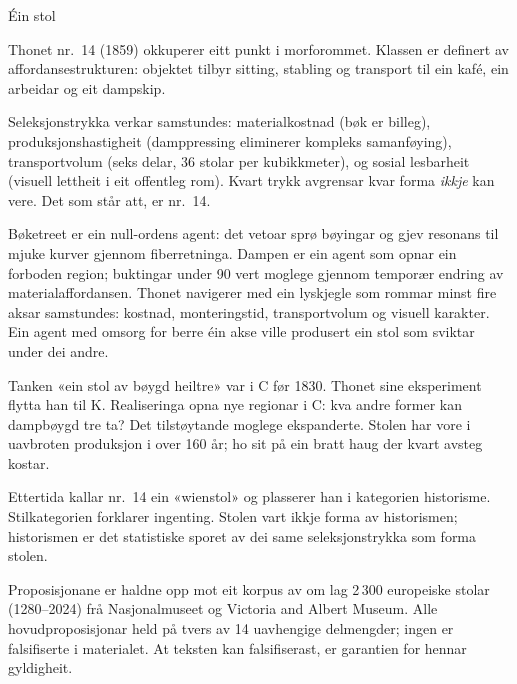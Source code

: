 \backmatter
{}
\begin{widebody}

\begin{overgang}Éin stol\end{overgang}

Thonet nr.~14 (1859) okkuperer eitt punkt i morforommet. Klassen er definert av affordansestrukturen: objektet tilbyr sitting, stabling og transport til ein kafé, ein arbeidar og eit dampskip.

Seleksjonstrykka verkar samstundes: materialkostnad (bøk er billeg), produksjonshastigheit (damppressing eliminerer kompleks samanføying), transportvolum (seks delar, 36 stolar per kubikkmeter), og sosial lesbarheit (visuell lettheit i eit offentleg rom). Kvart trykk avgrensar kvar forma \textit{ikkje} kan vere. Det som står att, er nr.~14.

Bøketreet er ein null-ordens agent: det vetoar sprø bøyingar og gjev resonans til mjuke kurver gjennom fiberretninga. Dampen er ein agent som opnar ein forboden region; buktingar under 90\textdegree{} vert moglege gjennom temporær endring av materialaffordansen. Thonet navigerer med ein lyskjegle som rommar minst fire aksar samstundes: kostnad, monteringstid, transportvolum og visuell karakter. Ein agent med omsorg for berre éin akse ville produsert ein stol som sviktar under dei andre.

Tanken «ein stol av bøygd heiltre» var i C før 1830. Thonet sine eksperiment flytta han til K. Realiseringa opna nye regionar i C: kva andre former kan dampbøygd tre ta? Det tilstøytande moglege ekspanderte. Stolen har vore i uavbroten produksjon i over 160 år; ho sit på ein bratt haug der kvart avsteg kostar.

Ettertida kallar nr.~14 ein «wienstol» og plasserer han i kategorien historisme. Stilkategorien forklarer ingenting. Stolen vart ikkje forma av historismen; historismen er det statistiske sporet av dei same seleksjonstrykka som forma stolen.

\bigskip

Proposisjonane er haldne opp mot eit korpus av om lag 2\,300 europeiske stolar (1280--2024) frå Nasjonalmuseet og Victoria and Albert Museum. Alle hovudproposisjonar held på tvers av 14 uavhengige delmengder; ingen er falsifiserte i materialet. At teksten kan falsifiserast, er garantien for hennar gyldigheit.

\end{widebody}
